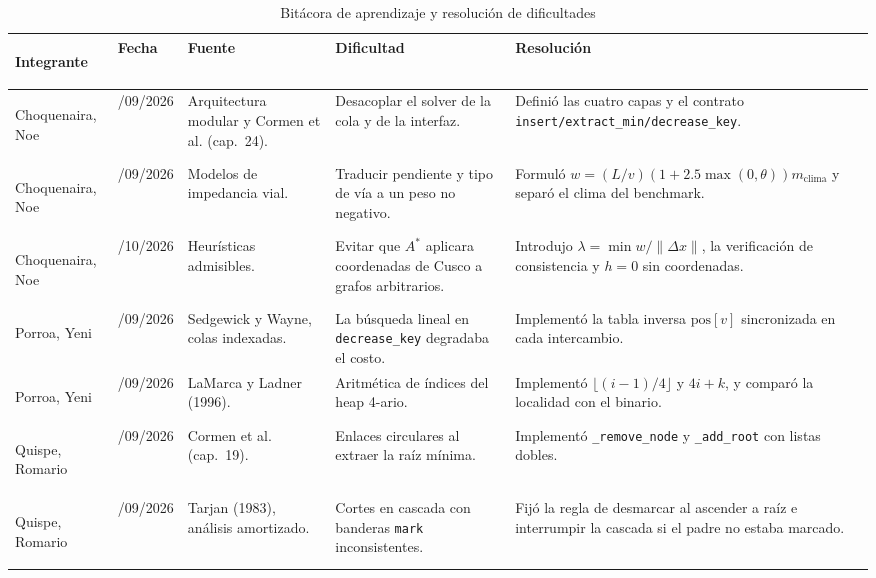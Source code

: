 \begin{table}[H]
    \centering
    \fontsize{8.3}{10.2}\selectfont
    \renewcommand{\arraystretch}{1.06}
    \setlength{\tabcolsep}{3.0pt}
    \caption{Bitácora de aprendizaje y resolución de dificultades}
    \label{tab:bitacora_detallada}
    \begin{tabularx}{\textwidth}{@{}>{\bfseries\raggedright\arraybackslash}p{2.3cm} >{\centering\arraybackslash}p{1.5cm} >{\raggedright\arraybackslash}p{3.2cm} >{\raggedright\arraybackslash}p{3.3cm} >{\raggedright\arraybackslash}X@{}}
        \toprule
        \textbf{Integrante} & \textbf{Fecha} & \textbf{Fuente} & \textbf{Dificultad} & \textbf{Resolución} \\
        \midrule
        Choquenaira, Noe & 18/09/2026 & Arquitectura modular y Cormen et al. (cap.~24). & Desacoplar el solver de la cola y de la interfaz. & Definió las cuatro capas y el contrato \texttt{insert/extract\_min/decrease\_key}. \\
        Choquenaira, Noe & 21/09/2026 & Modelos de impedancia vial. & Traducir pendiente y tipo de vía a un peso no negativo. & Formuló $w=(L/v)(1+2.5\max(0,\theta))m_{\text{clima}}$ y separó el clima del benchmark. \\
        Choquenaira, Noe & 02/10/2026 & Heurísticas admisibles. & Evitar que $A^*$ aplicara coordenadas de Cusco a grafos arbitrarios. & Introdujo $\lambda=\min w/\lVert\Delta x\rVert$, la verificación de consistencia y $h=0$ sin coordenadas. \\
        \midrule
        Porroa, Yeni & 20/09/2026 & Sedgewick y Wayne, colas indexadas. & La búsqueda lineal en \texttt{decrease\_key} degradaba el costo. & Implementó la tabla inversa $\text{pos}[v]$ sincronizada en cada intercambio. \\
        Porroa, Yeni & 25/09/2026 & LaMarca y Ladner (1996). & Aritmética de índices del heap 4-ario. & Implementó $\lfloor(i-1)/4\rfloor$ y $4i+k$, y comparó la localidad con el binario. \\
        \midrule
        Quispe, Romario & 24/09/2026 & Cormen et al. (cap.~19). & Enlaces circulares al extraer la raíz mínima. & Implementó \texttt{\_remove\_node} y \texttt{\_add\_root} con listas dobles. \\
        Quispe, Romario & 28/09/2026 & Tarjan (1983), análisis amortizado. & Cortes en cascada con banderas \texttt{mark} inconsistentes. & Fijó la regla de desmarcar al ascender a raíz e interrumpir la cascada si el padre no estaba marcado. \\

\end{tabularx}
\end{table}
